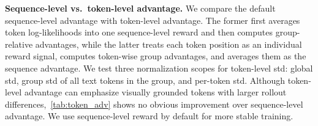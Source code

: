 \noindent \textbf{Sequence-level vs.\ token-level advantage.}
\label{sec:ablation_token}
We compare the default sequence-level advantage with token-level advantage. 
The former first averages token log-likelihoods into one sequence-level reward and then computes group-relative advantages, 
while the latter treats each token position as an individual reward signal,
computes token-wise group advantages, and averages them as the sequence advantage. 
We test three normalization scopes for token-level std: global std, group std of all text tokens in the group, and per-token std.
Although token-level advantage can emphasize visually grounded tokens with larger rollout differences,~\autoref{tab:token_adv} shows no obvious improvement over sequence-level advantage. 
We use sequence-level reward by default for more stable training.

